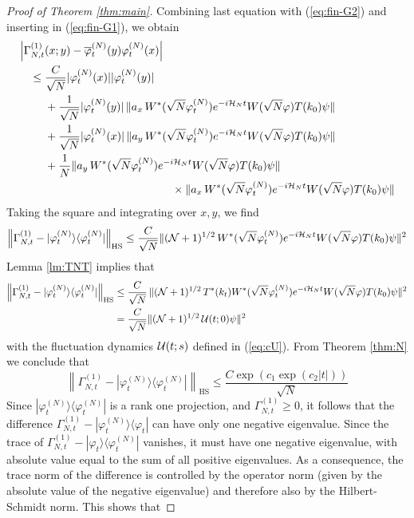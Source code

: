 \documentclass[11pt,a4paper,DIV11]{scrartcl}	%
\newcommand{\cU}{{\cal U}}
\newcommand{\cH}{{\cal H}}
\newcommand{\cN}{{\cal N}}
\begin{document}
\begin{proof}[Proof of Theorem \ref{thm:main}]
Combining last equation with (\ref{eq:fin-G2}) and inserting in (\ref{eq:fin-G1}), we obtain
\[ \begin{split} 
\Big| \Gamma^{(1)}_{N,t} &(x;y) - \overline{\varphi}_t^{(N)} (y) \varphi_t^{(N)} (x) \Big| \\ \leq \; & \frac{C}{\sqrt{N}} |\varphi_t^{(N)} (x)| |\varphi_t^{(N)} (y)| \\ &+ \frac{1}{\sqrt{N}} |\varphi^{(N)}_t (y)| \, \| a_x \, W^* (\sqrt{N} \varphi^{(N)}_t)  e^{-i\cH_N t} W(\sqrt{N} \varphi) T(k_0) \psi  \| \\ &+ \frac{1}{\sqrt{N}} |\varphi^{(N)}_t (x)| \, \| a_y \, W^* (\sqrt{N} \varphi^{(N)}_t)  e^{-i\cH_N t} W(\sqrt{N} \varphi) T(k_0) \psi  \| \\ & + \frac{1}{N} 
 \| a_y \, W^* (\sqrt{N} \varphi^{(N)}_t)  e^{-i\cH_N t} W(\sqrt{N} \varphi) T(k_0) \psi  \|   \\ &\hspace{4cm} \times \| a_x \, W^* (\sqrt{N} \varphi^{(N)}_t)  e^{-i\cH_N t} W(\sqrt{N} \varphi) T(k_0) \psi  \| \end{split} \] 
Taking the square and integrating over $x,y$, we find
\[ \left\| \Gamma^{(1)}_{N,t} - |\varphi^{(N)}_t \rangle \langle \varphi_t^{(N)}| \right\|_{\text{HS}} \leq \frac{C}{\sqrt{N}} \| (\cN + 1)^{1/2} \,  W^* (\sqrt{N} \varphi^{(N)}_t) e^{-i\cH_N t} W(\sqrt{N} \varphi) T(k_0) \psi \|^2 \]
Lemma \ref{lm:TNT} implies that
\[ \begin{split} \left\| \Gamma^{(1)}_{N,t} - |\varphi^{(N)}_t \rangle \langle \varphi_t^{(N)}| \right\|_{\text{HS}}  \leq \; &\frac{C}{\sqrt{N}} \,  \| (\cN + 1)^{1/2} \, T^* (k_t) W^* (\sqrt{N} \varphi^{(N)}_t) e^{-i\cH_N t} W(\sqrt{N} \varphi) T(k_0) \psi \|^2 \\ =\; &\frac{C}{\sqrt{N}} \| (\cN + 1)^{1/2} \, \cU (t;0) \psi \|^2  
\end{split}\]
with the fluctuation dynamics $\cU (t;s)$ defined in (\ref{eq:cU}).
{F}rom Theorem \ref{thm:N} we conclude that
\[ \left\| \Gamma^{(1)}_{N,t} - |\varphi^{(N)}_t \rangle \langle \varphi_t^{(N)}| \right\|_{\text{HS}} \leq \frac{C\exp (c_1 \exp (c_2 |t|))}{\sqrt{N}} \]
Since $|\varphi^{(N)}_t\rangle \langle \varphi^{(N)}_t|$ is a rank one projection, and $\Gamma_{N,t}^{(1)} \geq 0$, it follows that the difference $\Gamma_{N,t}^{(1)} - |\varphi^{(N)}_t \rangle \langle \varphi_t|$ can have only  one negative eigenvalue. Since the trace of $\Gamma_{N,t}^{(1)} - |\varphi_t \rangle \langle \varphi^{(N)}_t|$ vanishes, it must have one negative eigenvalue, with absolute value equal to the sum of all positive eigenvalues. As a consequence, the trace norm of the difference is controlled by the operator norm (given by the absolute value of the negative eigenvalue) and therefore also by the Hilbert-Schmidt norm. This shows that

\end{proof}
\end{document}
